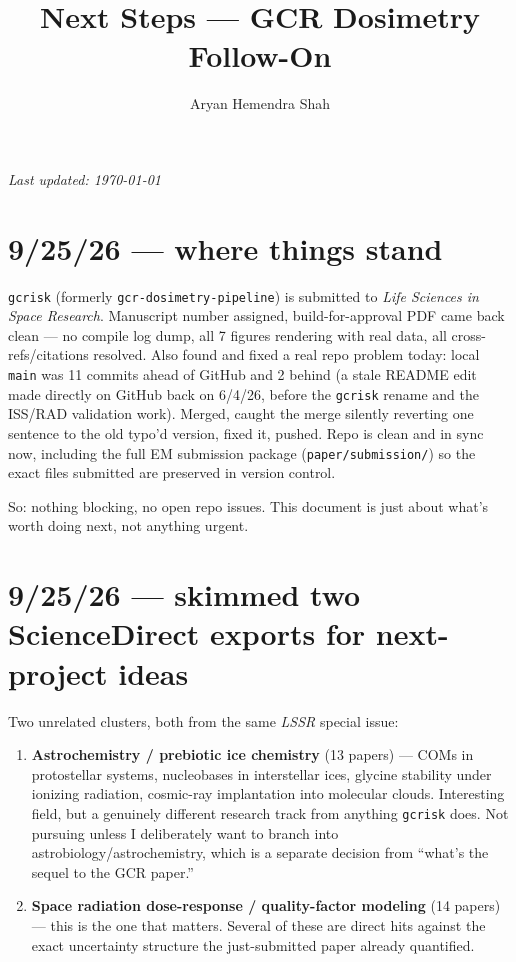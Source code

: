 \documentclass[12pt]{article}
\title{Next Steps --- GCR Dosimetry Follow-On}
\author{Aryan Hemendra Shah}
\begin{document}
\maketitle
\textit{\small Last updated: \today}

\section{9/25/26 --- where things stand}

\texttt{gcrisk} (formerly \texttt{gcr-dosimetry-pipeline}) is submitted to
\textit{Life Sciences in Space Research}. Manuscript number assigned,
build-for-approval PDF came back clean --- no compile log dump, all 7
figures rendering with real data, all cross-refs/citations resolved. Also
found and fixed a real repo problem today: local \texttt{main} was 11
commits ahead of GitHub and 2 behind (a stale README edit made directly on
GitHub back on 6/4/26, before the \texttt{gcrisk} rename and the ISS/RAD
validation work). Merged, caught the merge silently reverting one sentence
to the old typo'd version, fixed it, pushed. Repo is clean and in sync now,
including the full EM submission package (\texttt{paper/submission/}) so
the exact files submitted are preserved in version control.

So: nothing blocking, no open repo issues. This document is just about
what's worth doing next, not anything urgent.

\section{9/25/26 --- skimmed two ScienceDirect exports for next-project ideas}

Two unrelated clusters, both from the same \textit{LSSR} special issue:

\begin{enumerate}[itemsep=3pt]
    \item \textbf{Astrochemistry / prebiotic ice chemistry} (13 papers) ---
    COMs in protostellar systems, nucleobases in interstellar ices, glycine
    stability under ionizing radiation, cosmic-ray implantation into
    molecular clouds. Interesting field, but a genuinely different research
    track from anything \texttt{gcrisk} does. Not pursuing unless I
    deliberately want to branch into astrobiology/astrochemistry, which is
    a separate decision from ``what's the sequel to the GCR paper.''

    \item \textbf{Space radiation dose-response / quality-factor modeling}
    (14 papers) --- this is the one that matters. Several of these are
    direct hits against the exact uncertainty structure the just-submitted
    paper already quantified.
\end{enumerate}
\end{document}
